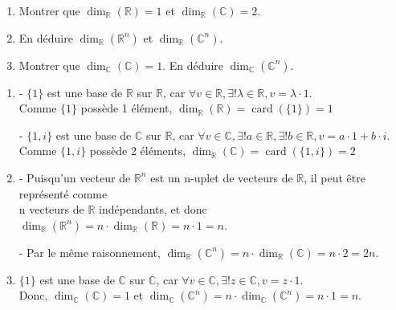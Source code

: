 \documentclass[a4paper, 10pt]{report}
\DeclareMathOperator{\card}{card}
\begin{document}
	\begin{enumerate}[label=(\alph*)]
		\item Montrer que $\dim_{\mathbb{R}}(\mathbb{R}) = 1$ et
		$\dim_{\mathbb{R}}(\mathbb{C}) = 2$.
		\item En déduire $\dim_{\mathbb{R}}(\mathbb{R}^n)$ et
		$\dim_{\mathbb{R}}(\mathbb{C}^n)$.
		\item Montrer que $\dim_{\mathbb{C}}(\mathbb{C}) = 1$.
		En déduire $\dim_{\mathbb{C}}(\mathbb{C}^n)$.
	\end{enumerate}
		
	\colorbox{solution}
	{
		\begin{minipage}{0.9\textwidth}
			\begin{enumerate}[label=(\alph*)]
				\item - $\{1\}$ est une base de $\mathbb{R}$ sur
				$\mathbb{R}$, car $\forall v \in \mathbb{R},
					\exists! \lambda \in \mathbb{R},
					v = \lambda \cdot 1$.\\
				\phantom{- }Comme $\{1\}$ possède 1 élément,
				$\dim_{\mathbb{R}}(\mathbb{R}) = \card(\{1\}) = 1$
				
				- $\{1, i\}$ est une base de $\mathbb{C}$ sur
				$\mathbb{R}$, car $\forall v \in \mathbb{C},
				\exists! a \in \mathbb{R}, \exists! b \in \mathbb{R},
				v = a \cdot 1 + b \cdot i$.\\
				\phantom{- }Comme $\{1, i\}$ possède 2 éléments,
				$\dim_{\mathbb{R}}(\mathbb{C}) = \card(\{1, i\}) = 2$
				\vspace{10pt}
				\item - Puisqu'un vecteur de $\mathbb{R}^n$ est un
				n-uplet de vecteurs de $\mathbb{R}$, il peut être
				représenté comme\\
				\phantom{- }n vecteurs de $\mathbb{R}$ indépendants,
				et donc $\dim_{\mathbb{R}}(\mathbb{R}^n)
				= n \cdot \dim_{\mathbb{R}}(\mathbb{R}) = n \cdot 1 = n$.
				
				- Par le même raisonnement, $\dim_{\mathbb{R}}(\mathbb{C}^n)
				= n \cdot \dim_{\mathbb{R}}(\mathbb{C}) = n \cdot 2 = 2n$.
				\item  $\{1\}$ est une base de $\mathbb{C}$ sur
				$\mathbb{C}$, car $\forall v \in \mathbb{C},
				\exists! z \in \mathbb{C}, v = z \cdot 1$.\\
				Donc, $\dim_{\mathbb{C}}(\mathbb{C}) = 1$ et
				$\dim_{\mathbb{C}}(\mathbb{C}^n)
					= n \cdot \dim_{\mathbb{C}}(\mathbb{C}^n)
					= n \cdot 1 = n$.
			\end{enumerate}
		\end{minipage}
	}
	
\end{document}
